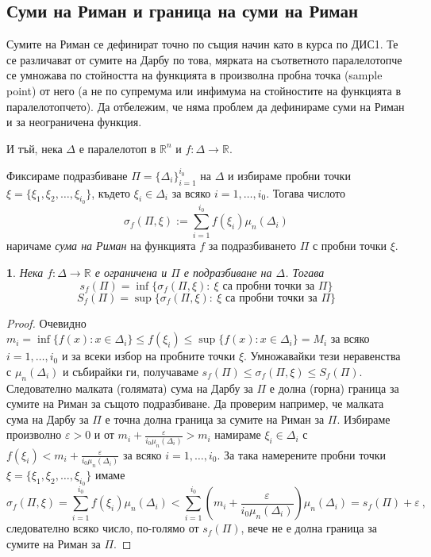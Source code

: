 \documentclass[11pt]{article}
\numberwithin{equation}{section}
\numberwithin{figure}{section}
\numberwithin{table}{section}
\theoremstyle{plain}
\theoremstyle{definition}
\theoremstyle{remark}
\theoremstyle{definition}
\theoremstyle{remark}
\theoremstyle{plain}
\theoremstyle{definition}
\theoremstyle{definition}
\theoremstyle{plain}
\theoremstyle{plain}
\newtheorem{prop}[thm]{\protect\propositionname}
\theoremstyle{plain}
\theoremstyle{definition}
\theoremstyle{plain}
\providecommand{\propositionname}{Твърдение}
\newcommand*{\R}{\mathbb{R}}
\begin{document}
\subsection{Суми на Риман и граница на суми на Риман}

Сумите на Риман се дефинират точно по същия начин като в курса по ДИС1.
Те се различават от сумите на Дарбу по това, мярката на съответното паралелотопче се умножава по стойността на функцията в произволна пробна точка (sample point) от него (а не по супремума или инфимума на стойностите на функцията в паралелотопчето). Да отбележим, че няма проблем да дефинираме суми на Риман и за неограничена функция.

И тъй, нека $\Delta$ е паралелотоп в $\R^n$ и $f:\Delta \rightarrow \R$.

Фиксираме подразбиване $\Pi = \{\Delta_i \}_{i=1}^{i_0}$ на $\Delta$ и избираме пробни точки $\xi = \{\xi_1, \xi_2, \dots , \xi_{i_0}\}$, където $\xi_i \in \Delta_i$ за всяко $i=1,\dots ,i_0$. Тогава числото
$$\sigma_f(\Pi, \xi) := \sum_{i=1}^{i_0}f(\xi_i)\mu_n(\Delta_i)$$
наричаме \textit{сума на Риман} на функцията $f$ за подразбиването $\Pi$ с пробни точки $\xi$.

\begin{prop}\label{RiemannDarboux}
Нека $f:\Delta \rightarrow \R$ е ограничена и $\Pi$ е подразбиване на $\Delta$. Тогава
$$s_f(\Pi)=\inf\{\sigma_f(\Pi, \xi): \ \xi \mbox{ са пробни точки за } \Pi\}$$
$$S_f(\Pi) = \sup\{\sigma_f(\Pi, \xi): \ \xi \mbox{ са пробни точки за } \Pi\}$$
\end{prop}

\begin{proof}
Очевидно
$m_i = \inf\{f(x) : x\in\Delta_i\}\le f(\xi_i) \le  \sup\{f(x) : x\in\Delta_i\}=M_i$ за всяко $i=1,\dots ,i_0$ и за всеки избор на пробните точки $\xi$. Умножавайки тези неравенства с $\mu_n(\Delta_i)$ и събирайки ги, получаваме $s_f(\Pi)\le \sigma_f(\Pi, \xi)\le S_f(\Pi)$. Следователно малката (голямата) сума на Дарбу за $\Pi$ е долна (горна) граница за сумите на Риман за същото подразбиване. Да проверим например, че малката сума на Дарбу за $\Pi$ е точна долна граница за сумите на Риман за $\Pi$. Избираме произволно $\varepsilon >0$ и от $m_i +\frac{\varepsilon}{i_0\mu_n(\Delta_i)} >m_i$ намираме $\xi_i\in \Delta_i$ с $f(\xi_i) < m_i +\frac{\varepsilon}{i_0\mu_n(\Delta_i)}$ за всяко $i=1,\dots ,i_0$. За така намерените пробни точки $\xi = \{\xi_1, \xi_2, \dots , \xi_{i_0}\}$ имаме
$$\sigma_f(\Pi, \xi) = \sum_{i=1}^{i_0}f(\xi_i)\mu_n(\Delta_i)< \sum_{i=1}^{i_0}\left( m_i +\frac{\varepsilon}{i_0\mu_n(\Delta_i)}\right)\mu_n(\Delta_i)= s_f(\Pi)+\varepsilon \ ,$$
следователно всяко число, по-голямо от $s_f(\Pi)$, вече не е долна граница за сумите на Риман за $\Pi$.
\end{proof}
\end{document}
